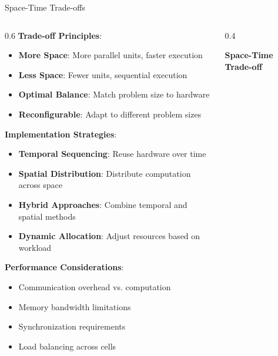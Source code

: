 \documentclass[aspectratio=169]{beamer}
\newcommand{\concept}[1]{\textbf{\color{darkblue}#1}}
\begin{document}
\begin{frame}{Space-Time Trade-offs}
\begin{columns}
\begin{column}{0.6\textwidth}
\concept{Trade-off Principles}:
\begin{itemize}
\item \textbf{More Space}: More parallel units, faster execution
\item \textbf{Less Space}: Fewer units, sequential execution
\item \textbf{Optimal Balance}: Match problem size to hardware
\item \textbf{Reconfigurable}: Adapt to different problem sizes
\end{itemize}

\vspace{0.3cm}
\concept{Implementation Strategies}:
\begin{itemize}
\item \textbf{Temporal Sequencing}: Reuse hardware over time
\item \textbf{Spatial Distribution}: Distribute computation across space
\item \textbf{Hybrid Approaches}: Combine temporal and spatial methods
\item \textbf{Dynamic Allocation}: Adjust resources based on workload
\end{itemize}

\vspace{0.3cm}
\concept{Performance Considerations}:
\begin{itemize}
\item Communication overhead vs. computation
\item Memory bandwidth limitations
\item Synchronization requirements
\item Load balancing across cells
\end{itemize}
\end{column}
\begin{column}{0.4\textwidth}
\begin{center}
\textbf{Space-Time Trade-off}
\vspace{0.3cm}

\end{center}
\end{column}
\end{columns}
\end{frame}
\end{document}
